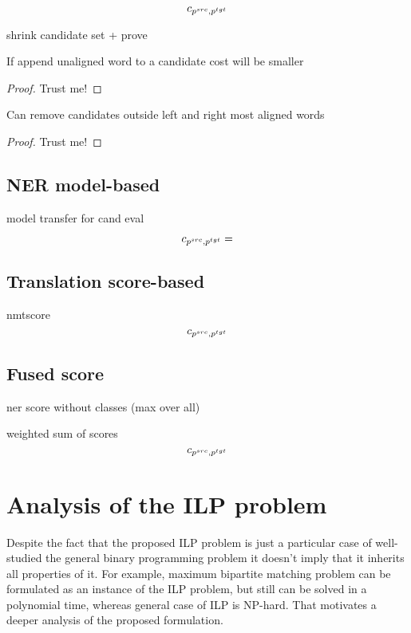 \begin{equation} \label{eq:align_cost}
    c_{p^{src}, p^{tgt}}
\end{equation}

shrink candidate set + prove

\begin{lemma}
    If append unaligned word to a candidate cost will be smaller
\end{lemma}
\begin{proof}
    Trust me!
\end{proof}

\begin{theorem}
    Can remove candidates outside left and right most aligned words
\end{theorem}
\begin{proof}
    Trust me!
\end{proof}

\subsection{NER model-based}

model transfer for cand eval

\begin{equation} \label{eq:ner_cost}
    c_{p^{src}, p^{tgt}} =
\end{equation}

\subsection{Translation score-based}

nmtscore
\begin{equation} \label{eq:nmt_cost}
    c_{p^{src}, p^{tgt}}
\end{equation}

\subsection{Fused score}

ner score without classes (max over all)

weighted sum of scores
\begin{equation} \label{eq:fused_cost}
    c_{p^{src}, p^{tgt}}
\end{equation}

\section{Analysis of the ILP problem}
Despite the fact that the proposed ILP problem is just a particular case
of well-studied the general binary programming problem it doesn't imply that
it inherits all properties of it. For example, maximum bipartite matching problem
can be formulated as an instance of the ILP problem, but still can be solved in a
polynomial time, whereas general case of ILP is NP-hard. That motivates a deeper analysis
of the proposed formulation.

